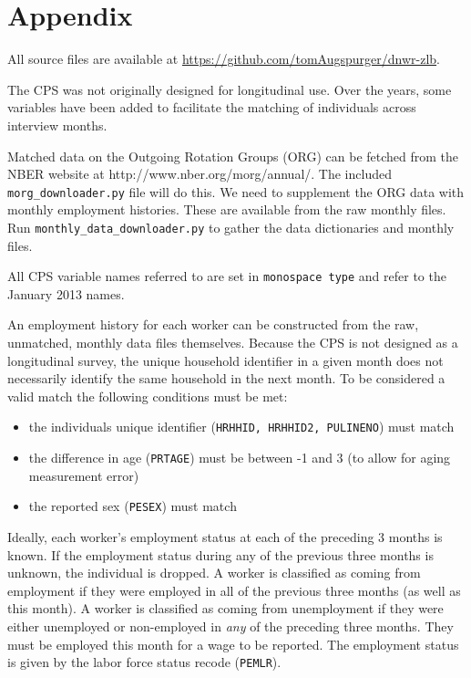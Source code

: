 \documentclass[11pt]{article}
\begin{document}
\appendix

\section{Appendix}
\label{sec:appendix}

All source files are available at \href{https://github.com/tomAugspurger/dnwr-zlb}{https://github.com/tomAugspurger/dnwr-zlb}.

The CPS was not originally designed for longitudinal use.
Over the years, some variables have been added to facilitate the matching of individuals across interview months.

Matched data on the Outgoing Rotation Groups (ORG) can be fetched from the NBER website at http://www.nber.org/morg/annual/.
The included \texttt{morg\_downloader.py} file will do this.
We need to supplement the ORG data with monthly employment histories.
These are available from the raw monthly files.
Run \texttt{monthly\_data\_downloader.py} to gather the data dictionaries and monthly files.

All CPS variable names referred to are set in \texttt{monospace type} and refer to the January 2013 names.

An employment history for each worker can be constructed from the raw, unmatched, monthly data files themselves.
Because the CPS is not designed as a longitudinal survey, the unique household identifier in a given month does not necessarily identify the same household in the next month.
To be considered a valid match the following conditions must be met:

\begin{itemize}
    \item the individuals unique identifier (\texttt{HRHHID, HRHHID2, PULINENO}) must match
    \item the difference in age (\texttt{PRTAGE}) must be between -1 and 3 (to allow for aging measurement error)
    \item the reported sex (\texttt{PESEX}) must match
\end{itemize}

Ideally, each worker's employment status at each of the preceding 3 months is known.
If the employment status during any of the previous three months is unknown, the individual is dropped.
A worker is classified as coming from employment if they were employed in all of the previous three months (as well as this month).
A worker is classified as coming from unemployment if they were either unemployed or non-employed in \emph{any} of the preceding three months.
They must be employed this month for a wage to be reported.
The employment status is given by the labor force status recode (\texttt{PEMLR}).
\end{document}
